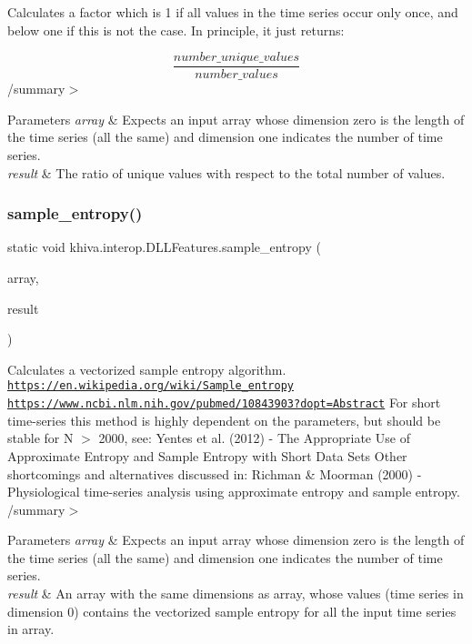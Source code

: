 Calculates a factor which is 1 if all values in the time series occur only once, and below one if this is not the case. In principle, it just returns\+: 

\[ \frac{\textit{number\_unique\_values}}{\textit{number\_values}} \] /summary$>$ 
\begin{DoxyParams}{Parameters}
{\em array} & Expects an input array whose dimension zero is the length of the time series (all the same) and dimension one indicates the number of time series.\\
\hline
{\em result} & The ratio of unique values with respect to the total number of values.\\
\hline
\end{DoxyParams}
\mbox{\label{classkhiva_1_1interop_1_1_d_l_l_features_adbc8254807e97c7d248744aaa1722ed9}} 
\subsubsection{\texorpdfstring{sample\+\_\+entropy()}{sample\_entropy()}}
{\footnotesize\ttfamily static void khiva.\+interop.\+D\+L\+L\+Features.\+sample\+\_\+entropy (\begin{DoxyParamCaption}\item[{\mbox{[}\+In\mbox{]} ref Int\+Ptr}]{array,  }\item[{\mbox{[}\+Out\mbox{]} out Int\+Ptr}]{result }\end{DoxyParamCaption})\hspace{0.3cm}{\ttfamily [static]}}



Calculates a vectorized sample entropy algorithm. \href{https://en.wikipedia.org/wiki/Sample_entropy}{\tt https\+://en.\+wikipedia.\+org/wiki/\+Sample\+\_\+entropy} \href{https://www.ncbi.nlm.nih.gov/pubmed/10843903?dopt=Abstract}{\tt https\+://www.\+ncbi.\+nlm.\+nih.\+gov/pubmed/10843903?dopt=\+Abstract} For short time-\/series this method is highly dependent on the parameters, but should be stable for N $>$ 2000, see\+: Yentes et al. (2012) -\/ The Appropriate Use of Approximate Entropy and Sample Entropy with Short Data Sets Other shortcomings and alternatives discussed in\+: Richman \& Moorman (2000) -\/ Physiological time-\/series analysis using approximate entropy and sample entropy. /summary$>$ 
\begin{DoxyParams}{Parameters}
{\em array} & Expects an input array whose dimension zero is the length of the time series (all the same) and dimension one indicates the number of time series.\\
\hline
{\em result} & An array with the same dimensions as array, whose values (time series in dimension 0) contains the vectorized sample entropy for all the input time series in array.\\
\hline
\end{DoxyParams}


